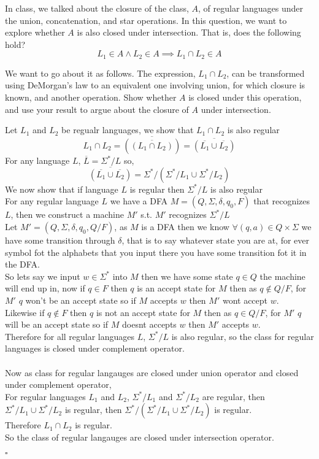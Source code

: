 \documentclass[addpoints]{exam}
\begin{document}
\begin{questions}
	\question[5] In class, we talked about the closure of the class, $A$, of regular languages under the union, concatenation, and star operations. In this question, we want to explore whether $A$ is also closed under intersection. That is, does the following hold?
	\[
		L_1\in A \land L_2\in A \implies L_1 \cap L_2\in A
	\]

	We want to go about it as follows. The expression, $L_1 \cap L_2$, can be transformed using DeMorgan's law to an equivalent one involving union, for which closure is known, and another operation. Show whether $A$ is closed under this operation, and use your result to argue about the closure of $A$ under intersection.
	\begin{solution}
		Let $L_1$ and $L_2$ be regualr languages, we show that $L_1 \cap L_2$ is also regular
		$$L_1 \cap L_2 = \overline{(\overline{(L_1 \cap L_2)})} = \overline{(\overline{L_1} \cup \overline{L_2})}$$
		For any language $L$, $\overline{L} = \Sigma^*/L$ so,
		$$\overline{(\overline{L_1} \cup \overline{L_2})} = \Sigma^*/(\Sigma^*/L_1 \cup \Sigma^*/L_2)$$
		We now show that if language $L$ is regular then $\Sigma^*/L$ is also regular
		\\For any regular language $L$ we have a DFA $M = (Q,\Sigma, \delta, q_0, F)$ that recognizes $L$, then we construct a machine $M'$ s.t. $M'$ recognizes $\Sigma^*/L$
		\\Let $M' = (Q,\Sigma, \delta, q_0, Q/F)$, as $M$ is a DFA then we know $\forall (q,a) \in Q \times \Sigma$ we have some transition through $\delta$, that is to say whatever state you are at, for ever symbol fot the alphabets that you input there you have some transition fot it in the DFA.
		\\So lets say we input $w \in \Sigma^*$ into $M$ then we have some state $q \in Q$ the machine will end up in, now if $q \in F$  then $q$ is an accept state for $M$ then as $q \not\in Q/F$, for $M'$ $q$ won't be an accept state so if $M$ accepts $w$ then $M'$ wont accept $w$.
		\\Likewise if $q \not\in F$  then $q$ is not an accept state for $M$ then as $q \in Q/F$, for $M'$ $q$ will be an accept state so if $M$ doesnt accepts $w$ then $M'$ accepts $w$.
		\\Therefore for all regular languages $L$, $\Sigma^*/L$ is also regular, so the class for regular languages is closed under complement operator.
		\\\\
		Now as class for regular langauges are closed under union operator and closed under complement operator,
		\\For regular languages $L_1$ and $L_2$, $\Sigma^*/L_1$ and $\Sigma^*/L_2$ are regular, then $\Sigma^*/L_1 \cup \Sigma^*/L_2$ is regular, then $\Sigma^*/(\Sigma^*/L_1 \cup \Sigma^*/L_2)$ is regular.
		\\Therefore $L_1 \cap L_2$ is regular.
		\\So the class of regular langauges are closed under intersection operator.
		\begin{flushright}
			$\square$
		\end{flushright}
	\end{solution}


\end{questions}
\end{document}
